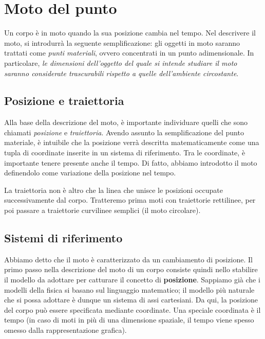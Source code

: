 

\marginpar{\minitoc}

\section{Moto del punto}
Un corpo è in moto quando la sua posizione cambia nel tempo. Nel descrivere il
moto, si introdurrà la seguente semplificazione: gli oggetti in moto saranno
trattati come \textit{punti materiali}, ovvero concentrati in un punto
adimensionale. In particolare, \textit{le dimensioni dell'oggetto del quale si
intende studiare il moto saranno considerate trascurabili rispetto a quelle
dell'ambiente circostante}.

\subsection{Posizione e traiettoria}
Alla base della descrizione del moto, è importante individuare quelli che sono
chiamati \textit{posizione} e \textit{traiettoria}. Avendo assunto la semplificazione
del punto materiale, è intuibile che la posizione verrà descritta matematicamente
come una tupla di coordinate inserite in un sistema di riferimento. Tra le
coordinate, è importante tenere presente anche il tempo. Di fatto, abbiamo
introdotto il moto definendolo come variazione della posizione nel tempo.

La traiettoria non è altro che la linea che unisce le posizioni occupate
successivamente dal corpo. Tratteremo prima moti con traiettorie rettilinee,
per poi passare a traiettorie curvilinee semplici (il moto circolare).

\subsection{Sistemi di riferimento}
Abbiamo detto che il moto è caratterizzato da un cambiamento di posizione. Il primo
passo nella descrizione del moto di un corpo consiste quindi nello stabilire il
modello da adottare per catturare il concetto di \textbf{posizione}. Sappiamo già
che i modelli della fisica si basano sul linguaggio matematico; il modello più
naturale che si possa adottare è dunque un sistema di assi cartesiani. Da qui, la
posizione del corpo può essere specificata mediante coordinate. Una speciale
coordinata è il tempo (in caso di moti in più di una dimensione spaziale, il
tempo viene spesso omesso dalla rappresentazione grafica).

